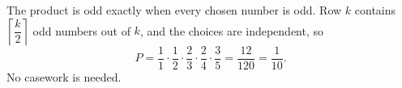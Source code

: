 The product is odd exactly when every chosen number is odd. Row $k$ contains $\left\lceil\dfrac {k}{2}\right\rceil$ odd numbers out of $k$, and the choices are independent, so
\[
P=\dfrac{1}{1}\cdot\dfrac{1}{2}\cdot\dfrac{2}{3}\cdot\dfrac{2}{4}\cdot\dfrac{3}{5}=\dfrac{12}{120}=\boxed{\dfrac{1}{10}}.
\]
No casework is needed.
